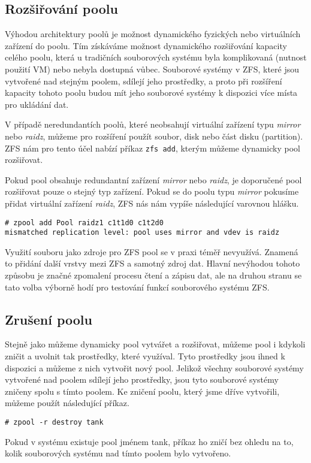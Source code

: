 \subsection{Rozšiřování poolu}
Výhodou architektury poolů je možnost dynamického fyzických nebo virtuálních zařízení do poolu. Tím získáváme možnost dynamického rozšiřování kapacity celého poolu, která u tradičních souborových systému byla komplikovaná (nutnost použití VM) nebo nebyla dostupná vůbec. Souborové systémy v ZFS, které jsou vytvořené nad stejným poolem, sdílejí jeho prostředky, a proto při rozšíření kapacity tohoto poolu budou mít jeho souborové systémy k dispozici více místa pro ukládání dat.

V případě neredundantích poolů, které neobsahují virtuální zařízení typu \emph{mirror} nebo \emph{raidz}, můžeme pro rozšíření použít soubor, disk nebo část disku (partition). ZFS nám pro tento účel nabízí příkaz \verb|zfs add|, kterým můžeme dynamicky pool rozšiřovat.

Pokud pool obsahuje redundantní zařízení \emph{mirror} nebo \emph{raidz}, je doporučené pool rozšiřovat pouze o stejný typ zařízení. Pokud se do poolu typu \emph{mirror} pokusíme přidat virtuální zařízení \emph{raidz}, ZFS nás nám vypíše následující varovnou hlášku.
\begin{verbatim}
# zpool add Pool raidz1 c1t1d0 c1t2d0
mismatched replication level: pool uses mirror and vdev is raidz
\end{verbatim}

Využití souboru jako zdroje pro ZFS pool se v praxi téměř nevyužívá. Znamená to přidání další vrstvy mezi ZFS a samotný zdroj dat. Hlavní nevýhodou tohoto způsobu je značné zpomalení procesu čtení a zápisu dat, ale na druhou stranu se tato volba výborně hodí pro testování funkcí souborového systému ZFS.

\subsection{Zrušení poolu}
Stejně jako můžeme dynamicky pool vytvářet a rozšiřovat, můžeme pool i kdykoli zničit a uvolnit tak prostředky, které využíval. Tyto prostředky jsou ihned k dispozici a můžeme z nich vytvořit nový pool. Jelikož všechny souborové systémy vytvořené nad poolem sdílejí jeho prostředky, jsou tyto souborové systémy zničeny spolu s tímto poolem. Ke zničení poolu, který jsme dříve vytvořili, můžeme použít následující příkaz.
\begin{verbatim}
# zpool -r destroy tank
\end{verbatim}
Pokud v systému existuje pool jménem tank, příkaz ho zničí bez ohledu na to, kolik souborových systému nad tímto poolem bylo vytvořeno.

